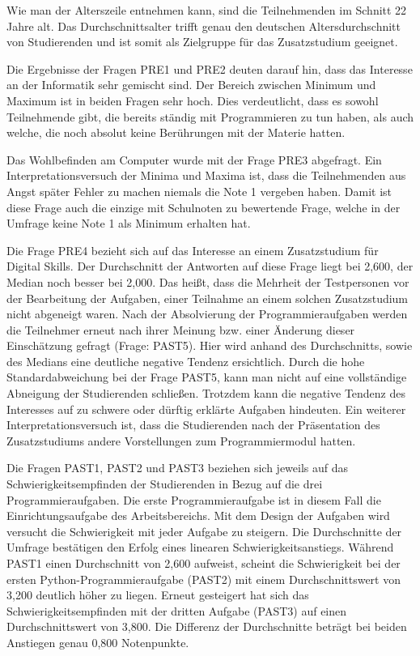 Wie man der Alterszeile entnehmen kann, sind die Teilnehmenden im Schnitt 22
Jahre alt. Das Durchschnittsalter trifft genau den deutschen Altersdurchschnitt
von Studierenden und ist somit als Zielgruppe für das Zusatzstudium geeignet.
\parencite{studie-alter-studierenden}

Die Ergebnisse der Fragen PRE1 und PRE2 deuten darauf hin, dass das Interesse
an der Informatik sehr gemischt sind. Der Bereich zwischen Minimum und Maximum
ist in beiden Fragen sehr hoch. Dies verdeutlicht, dass es sowohl Teilnehmende
gibt, die bereits ständig mit Programmieren zu tun haben, als auch welche, die
noch absolut keine Berührungen mit der Materie hatten.

Das Wohlbefinden am Computer wurde mit der Frage PRE3 abgefragt. Ein
Interpretationsversuch der Minima und Maxima ist, dass die Teilnehmenden aus
Angst später Fehler zu machen niemals die Note 1 vergeben haben. Damit ist diese
Frage auch die einzige mit Schulnoten zu bewertende Frage, welche in der Umfrage
keine Note 1 als Minimum erhalten hat.

Die Frage PRE4 bezieht sich auf das Interesse an einem Zusatzstudium für
Digital Skills. Der Durchschnitt der Antworten auf diese Frage liegt bei 2,600,
der Median noch besser bei 2,000. Das heißt, dass die Mehrheit der Testpersonen
vor der Bearbeitung der Aufgaben, einer Teilnahme an einem solchen Zusatzstudium
nicht abgeneigt waren. Nach der Absolvierung der Programmieraufgaben werden die 
Teilnehmer erneut nach ihrer Meinung bzw. einer Änderung dieser Einschätzung
gefragt (Frage: PAST5). Hier wird anhand des Durchschnitts, sowie des Medians
eine deutliche negative Tendenz ersichtlich. Durch die hohe Standardabweichung
bei der Frage PAST5, kann man nicht auf eine vollständige Abneigung der
Studierenden schließen. Trotzdem kann die negative Tendenz des Interesses auf zu
schwere oder dürftig erklärte Aufgaben hindeuten. Ein weiterer
Interpretationsversuch ist, dass die Studierenden nach der Präsentation des 
Zusatzstudiums andere Vorstellungen zum Programmiermodul hatten.

Die Fragen PAST1, PAST2 und PAST3 beziehen sich jeweils auf das
Schwierigkeitsempfinden der Studierenden in Bezug auf die drei
Programmieraufgaben. Die erste Programmieraufgabe ist in diesem Fall die
Einrichtungsaufgabe des Arbeitsbereichs. Mit dem Design der Aufgaben wird
versucht die Schwierigkeit mit jeder Aufgabe zu steigern. Die Durchschnitte der
Umfrage bestätigen den Erfolg eines linearen Schwierigkeitsanstiegs. Während
PAST1 einen Durchschnitt von 2,600 aufweist, scheint die Schwierigkeit bei der
ersten Python-Programmieraufgabe (PAST2) mit einem Durchschnittswert von 3,200
deutlich höher zu liegen. Erneut gesteigert hat sich das Schwierigkeitsempfinden
mit der dritten Aufgabe (PAST3) auf einen Durchschnittswert von 3,800. Die
Differenz der Durchschnitte beträgt bei beiden Anstiegen genau 0,800
Notenpunkte.

